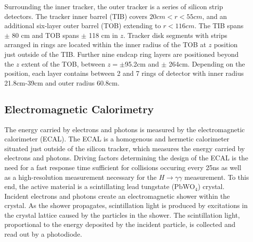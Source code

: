 
Surrounding the inner tracker, the outer tracker is a series of silicon strip detectors. The tracker inner barrel (TIB) covers $20 cm < r < 55 cm$, and an additional six-layer outer barrel (TOB) extending to $r<116cm$.  The TIB spans $\pm$ 80 cm and TOB spans $\pm$ 118 cm in $z$. 
Tracker disk segments with strips arranged in rings are located within the inner radius of the TOB at $z$ position just outside of the TIB. Further nine endcap ring layers are positioned beyond the $z$ extent of the TOB, between $z=\pm$95.2cm and $\pm$ 264cm. Depending on the position, each layer contains between 2 and 7 rings of detector with inner radius 21.8cm-39cm and outer radius 60.8cm. 




\subsection{Electromagnetic Calorimetry}\label{ch:cms:ecal}
The energy carried by electrons and photons is measured by the electromagnetic calorimeter (ECAL). The ECAL is a homogenous and hermetic calorimeter situated just outside of the silicon tracker, which measures the energy carried by electrons and photons.
Driving factors determining the design of the ECAL is the need for a fast response time sufficient for collisions occuring every 25ns as well as a high-resolution measurement necessary for the $H\rightarrow \gamma \gamma$ measurement. To this end, the active material is a scintillating lead tungstate ($\mathrm{PbWO_4}$) crystal. Incident electrons and photons create an electromagnetic shower within the crystal. As the shower propagates, scintillation light is produced by excitations in the crystal lattice caused by the particles in the shower. The scintillation light, proportional to the energy deposited by the incident particle, is collected and read out by a photodiode\cite{CERN-LHCC-97-033}.



